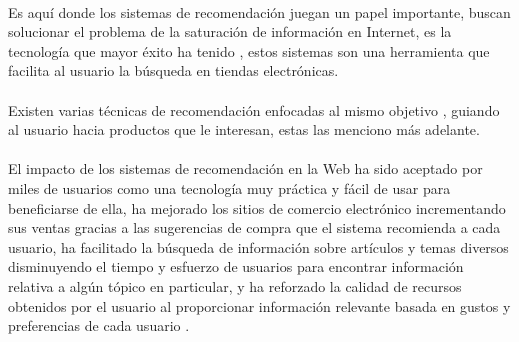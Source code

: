 \documentclass[12pt,letterpaper,oneside] {memoir}
\begin{document}
\paragraph{}
Es aquí donde los sistemas de recomendación juegan un papel importante, buscan solucionar el problema de la saturación de información en Internet, es la tecnología que mayor éxito ha tenido \cite{Balabanovic1997, BarrancoM.J;Mata2008, DeCamposLuis2008, Houstis2002, Meteren2001, Terveen1997, Espinilla2009, Wang2004}, estos sistemas son una herramienta que facilita al usuario la búsqueda en tiendas electrónicas. 
\paragraph{}
Existen varias técnicas de recomendación enfocadas al mismo objetivo \cite{Burke2002}, guiando al usuario hacia productos que le interesan, estas las menciono más adelante.
\paragraph{} 
El impacto de los sistemas de recomendación en la Web ha sido aceptado por miles de usuarios como una tecnología muy práctica y fácil de usar para beneficiarse de ella,  ha mejorado los sitios de comercio electrónico incrementando sus ventas gracias a las sugerencias de compra que el sistema recomienda a cada usuario, ha facilitado la búsqueda de información sobre artículos y temas diversos disminuyendo el tiempo y esfuerzo de usuarios para encontrar información relativa a algún tópico en particular, y ha reforzado la calidad de recursos obtenidos por el usuario al proporcionar información relevante basada en gustos y preferencias de cada usuario \cite{Acilar2009}.
\end{document}
